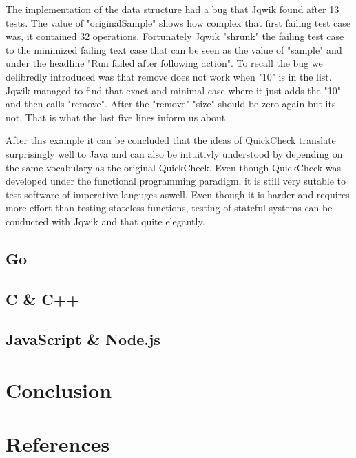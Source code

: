 \documentclass[a4paper, 12pt]{article} %
\begin{document}
The implementation of the data structure had a bug that Jqwik found after 13 tests. The value of "originalSample" shows how complex that first failing test case was, it contained 32 operations. Fortunately Jqwik "shrunk" the failing test case to the minimized failing text case that can be seen as the value of "sample" and under the headline "Run failed after following action". To recall the bug we delibredly introduced was that remove does not work when "10" is in the list. Jqwik managed to find that exact and minimal case where it just adds the "10" and then calls "remove". After the "remove" "size" should be zero again but its not. That is what the last five lines inform us about.

After this example it can be concluded that the ideas of QuickCheck translate surprisingly well to Java and can also be intuitivly understood by depending on the same vocabulary as the original QuickCheck. Even though QuickCheck was developed under the functional programming paradigm, it is still very sutable to test software of imperative languges aswell. Even though it is harder and requires more effort than testing stateless functions, testing of stateful systems can be conducted with Jqwik and that quite elegantly.


\subsection{Go}
\subsection{C \& C++}
\subsection{JavaScript \& Node.js}

\section{Conclusion}


\newpage
\section{References}
\printbibliography[heading=none]
\end{document}
